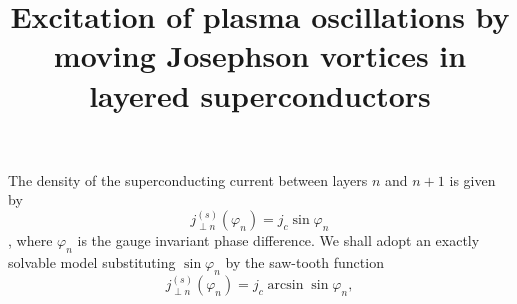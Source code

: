 %
%



\title{Excitation of plasma oscillations by moving Josephson vortices in
layered superconductors}
\author{ }
\maketitle

The density of the superconducting current between layers $n$ and $n+1$ is
given by $$j^{(s)}_{\perp n}(\varphi_n)=j_c \sin{\varphi_n}$$,
where $\varphi_n$ is the gauge invariant phase difference. We shall adopt an
exactly solvable model substituting $\sin{\varphi_n}$ by the saw-tooth
function
\begin{equation}
%
%
j^{(s)}_{\perp n}(\varphi_n)=j_c\arcsin{\sin{\varphi_n}},
\end{equation}

